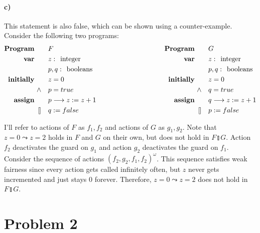 \documentclass[10pt,letter]{article}
\def\fatbar{\talloblong}
\begin{document}
\paragraph{c)} This statement is also false, which can be shown using a counter-example. Consider the following two programs:
\begin{align*}
\begin{aligned}
\textrm{\textbf{Program}} \qquad & F
\\
\textrm{\textbf{var}} \qquad & z\; \textrm{:\; integer}
\\ & p, q\; \textrm{:\; booleans}
\\
\textrm{\textbf{initially}} \qquad & z = 0
\\ \land \quad & p = true
\\
\textrm{\textbf{assign}} \qquad &
p \longrightarrow z := z + 1
\\
\fatbar \quad & q := false
\end{aligned}
\qquad \qquad \qquad \qquad \qquad
\begin{aligned}
\textrm{\textbf{Program}} \qquad & G
\\
\textrm{\textbf{var}} \qquad & z\; \textrm{:\; integer}
\\ & p, q\; \textrm{:\; booleans}
\\
\textrm{\textbf{initially}} \qquad & z = 0
\\ \land \quad & q = true
\\
\textrm{\textbf{assign}} \qquad &
q \longrightarrow z := z + 1
\\
\fatbar \quad & p := false
\end{aligned}
\end{align*}

I'll refer to actions of $F$ as $f_1, f_2$ and actions of $G$ as $g_1, g_2$. Note that $z = 0 \leadsto z = 2$ holds in $F$ and $G$ on their own, but does not hold in $F \fatbar G$. Action $f_2$ deactivates the guard on $g_1$ and action $g_2$ deactivates the guard on $f_1$. Consider the sequence of actions $(f_2, g_2, f_1, f_2)^\omega$. This sequence satisfies weak fairness since every action gets called infinitely often, but $z$ never gets incremented and just stays $0$ forever. Therefore, $z = 0 \leadsto z = 2$ does not hold in $F \fatbar G$.

\pagebreak

\section*{Problem 2}
\end{document}

